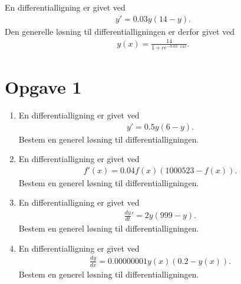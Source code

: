 \begin{exa}
	En differentialligning er givet ved
	\begin{align*}
		y' = 0.03y(14-y).
	\end{align*}
	Den generelle løsning til differentialligningen er derfor givet ved
	\begin{align*}
		y(x) = \frac{14}{1+ce^{-0.03\cdot 14 x}}.
	\end{align*}
\end{exa}

\section*{Opgave 1}

\begin{enumerate}[label=\roman*)]
	\item En differentialligning er givet ved
	\begin{align*}
		y' = 0.5y(6-y).
	\end{align*}
	Bestem en generel løsning til differentialligningen. 
	\item En differentialligning er givet ved
	\begin{align*}
		f'(x) = 0.04f(x)(1000523-f(x)).
	\end{align*}
	Bestem en generel løsning til differentialligningen. 
	\item En differentialligning er givet ved
	\begin{align*}
		\frac{dy}{dt}' = 2y(999-y).
	\end{align*}
	Bestem en generel løsning til differentialligningen. 
	\item En differentialligning er givet ved
	\begin{align*}
		\frac{dy}{dx} = 0.00000001y(x)(0.2-y(x)).
	\end{align*}
	Bestem en generel løsning til differentialligningen. 
\end{enumerate}

